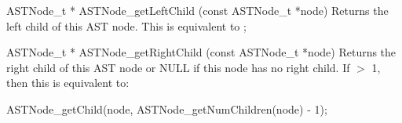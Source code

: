 \documentclass{sbmlmanual}
\begin{document}
\begin{methoddef}{ASTNode\_t * ASTNode\_getLeftChild (const ASTNode\_t *node)}
  Returns the left child of this AST node.  This is equivalent to
  ;
\end{methoddef}


\begin{methoddef}{ASTNode\_t * ASTNode\_getRightChild (const ASTNode\_t *node)}
  Returns the right child of this AST node or NULL if this node has no
  right child.  If  $>$ 1, then this is
  equivalent to:
  \begin{example}[c]
    ASTNode_getChild(node, ASTNode_getNumChildren(node) - 1);
  \end{example}
\end{methoddef}
\end{document}
